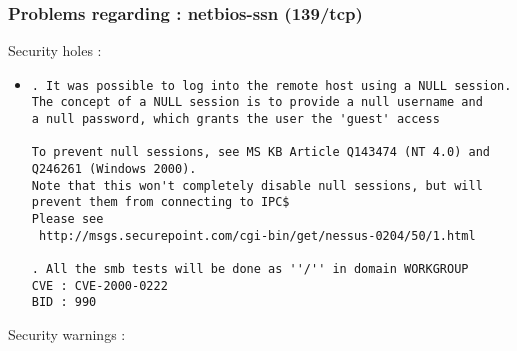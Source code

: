 \documentclass{article}
\begin{document}
\subsubsection{Problems regarding : netbios-ssn (139/tcp)}
Security holes :\\
\begin{itemize}
\item \begin{verbatim}
. It was possible to log into the remote host using a NULL session.
The concept of a NULL session is to provide a null username and
a null password, which grants the user the 'guest' access

To prevent null sessions, see MS KB Article Q143474 (NT 4.0) and
Q246261 (Windows 2000). 
Note that this won't completely disable null sessions, but will 
prevent them from connecting to IPC$
Please see
 http://msgs.securepoint.com/cgi-bin/get/nessus-0204/50/1.html

. All the smb tests will be done as ''/'' in domain WORKGROUP      
CVE : CVE-2000-0222
BID : 990
\end{verbatim}\end{itemize}
Security warnings :\\
\end{document}
